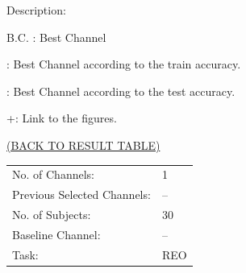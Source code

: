 \documentclass[oneside, a4paper,10pt]{report}
\begin{document}
Description:

B.C. : Best Channel

: Best Channel according to the train accuracy.

: Best Channel according to the test accuracy.

+: Link to the figures.


\newpage

\hspace*{12cm}\hyperlink{tab:TestResults}{(BACK TO RESULT TABLE)}

\bigskip
\bigskip

\begin{tabular}{ll}
  No. of Channels: & 1\\
  Previous Selected Channels: & --\\
  No. of Subjects: & 30\\
  Baseline Channel: & --\\
  Task:	& REO 
\end{tabular}

\bigskip
\end{document}
